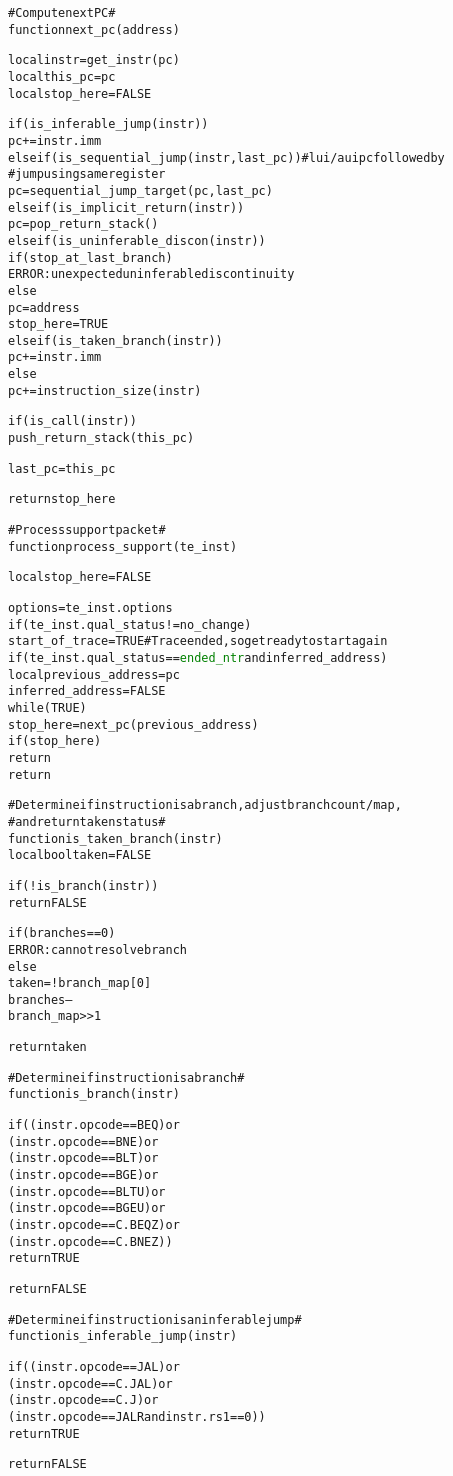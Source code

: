 \begin{alltt}
# Compute next PC #
function next_pc (address)

  local instr     = get_instr(pc)
  local this_pc   = pc
  local stop_here = FALSE

  if (is_inferable_jump(instr))
    pc += instr.imm
  else if (is_sequential_jump(instr, last_pc)) # lui/auipc followed by
                                               #  jump using same register
    pc = sequential_jump_target(pc, last_pc)
  else if (is_implicit_return(instr))
    pc = pop_return_stack()
  else if (is_uninferable_discon(instr))
    if (stop_at_last_branch)
      ERROR: unexpected uninferable discontinuity
    else
      pc        = address
      stop_here = TRUE
  else if (is_taken_branch(instr))
    pc += instr.imm
  else
    pc += instruction_size(instr)

  if (is_call(instr))
    push_return_stack(this_pc)

  last_pc = this_pc
  
  return stop_here

# Process support packet #
function process_support (te_inst)

  local stop_here = FALSE

  options = te_inst.options
    if (te_inst.qual_status != no_change)
      start_of_trace = TRUE # Trace ended, so get ready to start again
    if (te_inst.qual_status == \textcolor{green}{ended_ntr} and inferred_address)
      local previous_address = pc
      inferred_address       = FALSE
      while (TRUE)
        stop_here = next_pc(previous_address)
        if (stop_here)
          return
    return
\end{alltt}

\pagebreak

\begin{alltt}
# Determine if instruction is a branch, adjust branch count/map,
#   and return taken status #
function is_taken_branch (instr)
  local bool taken = FALSE

  if (!is_branch(instr))
    return FALSE

  if (branches == 0)
    ERROR: cannot resolve branch
  else
    taken = !branch_map[0]
    branches--
    branch_map >> 1

  return taken

# Determine if instruction is a branch #
function is_branch (instr)

  if ((instr.opcode == BEQ)    or
      (instr.opcode == BNE)    or
      (instr.opcode == BLT)    or
      (instr.opcode == BGE)    or
      (instr.opcode == BLTU)   or
      (instr.opcode == BGEU)   or
      (instr.opcode == C.BEQZ) or
      (instr.opcode == C.BNEZ))
    return TRUE

  return FALSE

# Determine if instruction is an inferable jump #
function is_inferable_jump (instr)

  if ((instr.opcode == JAL)   or
      (instr.opcode == C.JAL) or
      (instr.opcode == C.J)   or
      (instr.opcode == JALR and instr.rs1 == 0))
    return TRUE

  return FALSE
\end{alltt}


